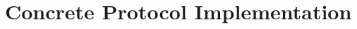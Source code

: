 \documentclass[fleqn,10pt]{SelfArx} %
\begin{document}
















\newversion{
	
	
	
}










\section{Concrete Protocol Implementation}\label{sec:parameters}

\end{document}
